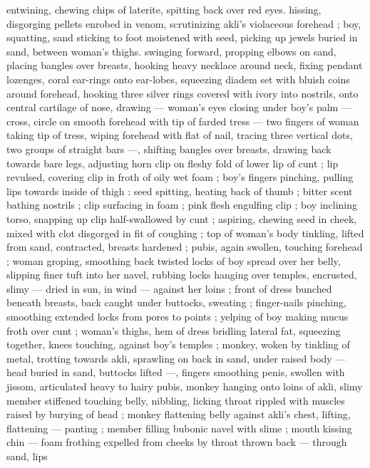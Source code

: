 entwining, chewing chips of laterite, spitting back over red eyes. 
hissing, disgorging pellets enrobed in venom, scrutinizing akli's 
violaceous forehead ; boy, squatting, sand sticking to foot moistened 
with seed, picking up jewels buried in sand, between woman's thighs. 
swinging forward, propping elbows on sand, placing bangles over 
breasts, hooking heavy necklace around neck, fixing pendant 
lozenges, coral ear-rings onto ear-lobes, squeezing diadem set with 
bluish coins around forehead, hooking three silver rings covered with 
ivory into nostrils, onto central cartilage of nose, drawing --- 
woman's eyes closing under boy's palm --- cross, circle on smooth 
forehead with tip of farded tress --- two fingers of woman taking tip 
of tress, wiping forehead with flat of nail, tracing three vertical dots, 
two groups of straight bars ---, shifting bangles over breasts, 
drawing back towards bare legs, adjusting horn clip on fleshy fold of 
lower lip of cunt ; lip revulsed, covering clip in froth of oily wet foam 
; boy's fingers pinching, pulling lips towards inside of thigh : seed 
spitting, heating back of thumb ; bitter scent bathing nostrils ; clip 
surfacing in foam ; pink flesh engulfing clip ; boy inclining torso, 
snapping up clip half-swallowed by cunt ; aspiring, chewing seed in 
cheek, mixed with clot disgorged in fit of coughing ; top of woman's 
body tinkling, lifted from sand, contracted, breasts hardened ; pubis, 
again swollen, touching forehead ; woman groping, smoothing back 
twisted locks of boy spread over her belly, slipping finer tuft into her 
navel, rubbing locks hanging over temples, encrusted, slimy --- dried 
in sun, in wind --- against her loins ; front of dress bunched beneath 
breasts, back caught under buttocks, sweating ; finger-nails pinching, 
smoothing extended locks from pores to points ; yelping of boy 
making mucus froth over cunt ; woman's thighs, hem of dress 
bridling lateral fat, squeezing together, knees touching, against 
boy's temples ; monkey, woken by tinkling of metal, trotting towards 
akli, sprawling on back in sand, under raised body --- head buried in 
sand, buttocks lifted ---, fingers smoothing penis, swollen with 
jissom, articulated heavy to hairy pubis, monkey hanging onto loins 
of akli, slimy member stiffened touching belly, nibbling, licking throat 
rippled with muscles raised by burying of head ; monkey flattening 
belly against akli's chest, lifting, flattening --- panting ; member 
filling bubonic navel with slime ; mouth kissing chin --- foam frothing 
expelled from cheeks by throat thrown back --- through sand, lips 
